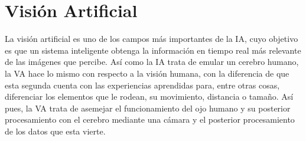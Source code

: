 \section{Visión Artificial}
\label{sec:subseccion}
La visión artificial es uno de los campos más importantes de la IA, cuyo objetivo es que un sistema inteligente obtenga la información en tiempo real más relevante de las imágenes que percibe. Así como la IA trata de emular un cerebro humano, la VA hace lo mismo con respecto a la visión humana, con la diferencia de que esta segunda cuenta con las experiencias aprendidas para, entre otras cosas, diferenciar los elementos que le rodean, su movimiento, distancia o tamaño. Así pues, la VA trata de asemejar el funcionamiento del ojo humano y su posterior procesamiento con el cerebro mediante  una cámara y el posterior procesamiento de los datos que esta vierte.\\

